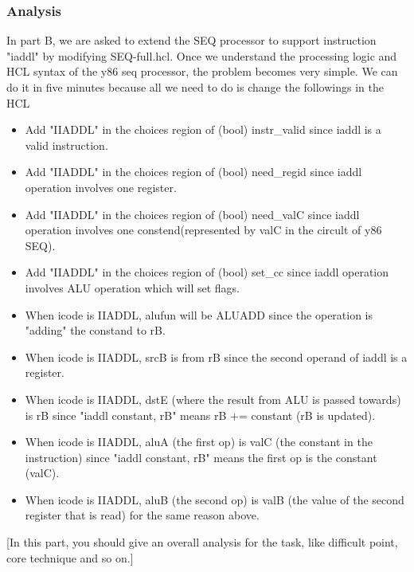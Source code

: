 \documentclass{article}
\begin{document}
\subsubsection{Analysis}
In part B, we are asked to extend the SEQ processor to support instruction "iaddl" by modifying SEQ-full.hcl.
Once we understand the processing logic and HCL syntax of the y86 seq processor, the problem becomes very simple.
We can do it in five minutes because all we need to do is change the followings in the HCL
\begin{itemize}
        \item Add "IIADDL" in the choices region of (bool) instr\_valid since iaddl is a valid instruction.
        \item Add "IIADDL" in the choices region of (bool) need\_regid since iaddl operation involves one register.
        \item Add "IIADDL" in the choices region of (bool) need\_valC since iaddl operation involves one constend(represented by valC in the circult of y86 SEQ).
        \item Add "IIADDL" in the choices region of (bool) set\_cc since iaddl operation involves ALU operation which will set flags.
        \item When icode is IIADDL, alufun will be ALUADD since the operation is "adding" the constand to rB.
        \item When icode is IIADDL, srcB is from rB since the second operand of iaddl is a register.
        \item When icode is IIADDL, dstE (where the result from ALU is passed towards) is rB since "iaddl constant, rB" means rB += constant (rB is updated). 
        \item When icode is IIADDL, aluA (the first op) is valC (the constant in the instruction) since "iaddl constant, rB" means the first op is the constant (valC).
        \item When icode is IIADDL, aluB (the second op) is valB (the value of the second register that is read) for the same reason above.
\end{itemize}
[In this part, you should give an overall analysis for the task, like difficult point, core technique and so on.]
\end{document}

